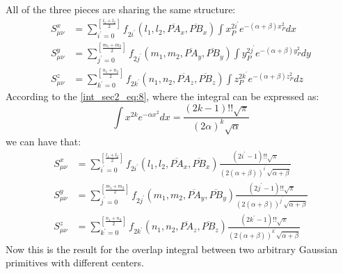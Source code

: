 All of the three pieces are sharing the same structure:
\begin{align}
 \label{overlap_direct_int_eq:7}
S_{\mu\nu}^{x} &= \sum_{i^{'}=0}^{\left[ \frac{l_{1}+l_{2}}{2}\right] }
                  f_{2i^{'}}(l_{1},l_{2},\overline{PA}_{x},\overline{PB}_{x})
                  \int x_{P}^{2i^{'}}e^{-(\alpha+\beta)x_{P}^{2}} dx \nonumber \\
S_{\mu\nu}^{y} &= \sum_{j^{'}=0}^{\left[ \frac{m_{1}+m_{2}}{2}\right] }
                  f_{2j^{'}}(m_{1},m_{2},\overline{PA}_{y},\overline{PB}_{y})
                  \int y_{P}^{2j^{'}}e^{-(\alpha+\beta)y_{P}^{2}} dy \nonumber \\
S_{\mu\nu}^{z} &= \sum_{k^{'}=0}^{\left[ \frac{n_{1}+n_{2}}{2}\right] }
                  f_{2k^{'}}(n_{1},n_{2},\overline{PA}_{z},\overline{PB}_{z})
                  \int z_{P}^{2k^{'}}e^{-(\alpha+\beta)z_{P}^{2}} dz
\end{align}
According to the \ref{int_sec2_eq:8}, where the integral can be expressed as:
\begin{equation}
\int x^{2k}e^{-\alpha x^{2}} dx = 
\frac{(2k-1)!!\sqrt{\pi}}{(2\alpha)^{k}\sqrt{\alpha}}
\end{equation}
we can have that:
\begin{align}
 \label{overlap_direct_int_eq:8}
S_{\mu\nu}^{x} &= \sum_{i^{'}=0}^{\left[ \frac{l_{1}+l_{2}}{2}\right] }
                  f_{2i^{'}}(l_{1},l_{2},\overline{PA}_{x},\overline{PB}_{x})
                  \frac{(2i^{'}-1)!!\sqrt{\pi}}{(2(\alpha+\beta))^{i^{'}}\sqrt{\alpha+\beta}}
                  \nonumber \\
S_{\mu\nu}^{y} &= \sum_{j^{'}=0}^{\left[ \frac{m_{1}+m_{2}}{2}\right] }
                  f_{2j^{'}}(m_{1},m_{2},\overline{PA}_{y},\overline{PB}_{y})
                  \frac{(2j^{'}-1)!!\sqrt{\pi}}{(2(\alpha+\beta))^{j^{'}}\sqrt{\alpha+\beta}}
                  \nonumber \\
S_{\mu\nu}^{z} &= \sum_{k^{'}=0}^{\left[ \frac{n_{1}+n_{2}}{2}\right] }
                  f_{2k^{'}}(n_{1},n_{2},\overline{PA}_{z},\overline{PB}_{z})
                  \frac{(2k^{'}-1)!!\sqrt{\pi}}{(2(\alpha+\beta))^{k^{'}}\sqrt{\alpha+\beta}}
\end{align}
Now this is the result for the overlap integral between two arbitrary Gaussian primitives with
different centers.

